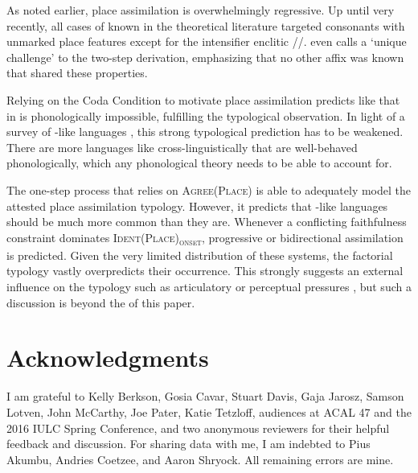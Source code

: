 \documentclass[output=paper]{LSP/langsci}
\begin{document}
As noted earlier, place assimilation is overwhelmingly regressive. Up until very recently, all cases of  known in the theoretical literature targeted consonants with unmarked place features except for the  intensifier enclitic //. \citet{mccarthy2007} even calls  a `unique challenge' to the two-step derivation, emphasizing that no other affix was known that shared these properties.

Relying on the Coda Condition to motivate place assimilation predicts  like that in  is phonologically impossible, fulfilling the typological observation. In light of a survey of -like languages \citep{lamont2015}, this strong typological prediction has to be weakened. There are more languages like  cross-linguistically that are well-behaved phonologically, which any phonological theory needs to be able to account for.

The one-step process that relies on \textsc{Agree(Place)} is able to adequately model the attested place assimilation typology. However, it predicts that -like languages should be much more common than they are. Whenever a conflicting faithfulness constraint dominates \textsc{Ident(Place)\textsubscript{onset}}, progressive or bidirectional assimilation is predicted. Given the very limited distribution of these systems, the factorial typology vastly overpredicts their occurrence. This strongly suggests an external influence on the typology such as articulatory or perceptual pressures \citep{jun1995,steriade2001}, but such a discussion is beyond the  of this paper.

\section*{Acknowledgments}

I am grateful to Kelly Berkson, Gosia Cavar, Stuart Davis, Gaja Jarosz, Samson Lotven, John McCarthy, Joe Pater, Katie Tetzloff, audiences at ACAL 47 and the 2016 IULC Spring Conference, and two anonymous reviewers for their helpful feedback and discussion. For sharing data with me, I am indebted to Pius Akumbu, Andries Coetzee, and Aaron Shryock. All remaining errors are mine.
\end{document}
